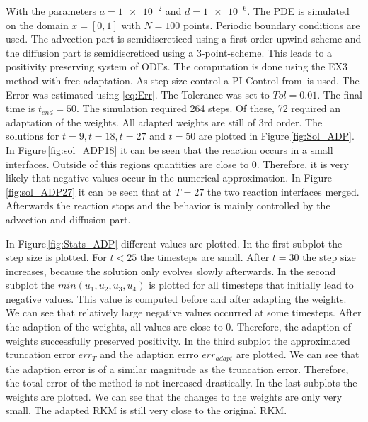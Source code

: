 \documentclass[a4paper]{article}
\numberwithin{equation}{section}
\theoremstyle{plain}
\theoremstyle{definition}
\numberwithin{theorem}{section}
\newcommand{\1}{\mathbbm{1}}
\begin{document}
With the parameters $a=\num{1e-2} $ and $ d=\num{1e-6}$. 
The PDE is simulated on the domain $x = [0,1]$ with $N=100$ points. Periodic boundary conditions are used. 
The advection part is semidiscreticed using a first order upwind scheme and the diffusion part is semidiscreticed using a 3-point-scheme. This leads to a positivity preserving system of ODEs.  
The computation is done using the EX3 method with free adaptation. 
As step size control a PI-Control from\,\cite{hairer_solving_1996} is used. The Error was estimated using \eqref{eq:Err}. The Tolerance was set to $Tol = 0.01$.  
The final time is $t_{end} = 50$. 
The simulation required 264 steps. Of these, 72 required an adaptation of the weights. 
All adapted weights are still of 3rd order.
The solutions for $t=9,t=18,t=27$ and $t=50$ are plotted in Figure\,\ref{fig:Sol_ADP}. 
In Figure\,\ref{fig:sol_ADP18} it can be seen that the reaction occurs in a small interfaces. 
Outside of this regions quantities are close to $0$. Therefore, it is very likely that negative values occur in the numerical approximation. 
In Figure\,\ref{fig:sol_ADP27} it can be seen that at $T=27$ the two reaction interfaces merged. Afterwards the reaction stops and the behavior is mainly controlled by the advection and diffusion part.  

In Figure\,\ref{fig:Stats_ADP} different values are plotted.  
In the first subplot the step size is plotted. For $t<25$ the timesteps are small. After $t = 30$ the step size increases, because the solution only evolves slowly afterwards. 
In the second subplot the $min(u_1,u_2,u_3,u_4)$ is plotted for all timesteps that initially lead to negative values. This value is computed before and after adapting the weights.  
We can see that relatively large negative values occurred at some timesteps. 
After the adaption of the weights, all values are close to $0$. Therefore, the adaption of weights successfully preserved positivity. 
In the third subplot the approximated truncation error $err_T$ and the adaption errro $err_{adapt}$ are plotted. 
We can see that the adaption error is of a similar magnitude as the truncation error. Therefore, the total error of the method is not increased drastically.  
In the last subplots the weights are plotted.  
We can see that the changes to the weights are only very small. The adapted RKM is still very close to the original RKM. 
\end{document}
